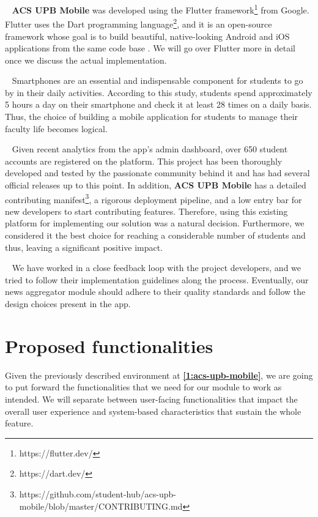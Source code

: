 ~
\textbf{ACS UPB Mobile} was developed using the Flutter framework\footnote{https://flutter.dev/} from Google. Flutter uses the Dart programming language\footnote{https://dart.dev/}, and it is an open-source framework whose goal is to build beautiful, native-looking Android and iOS applications from the same code base \cite{whatisflutter}. We will go over Flutter more in detail once we discuss the actual implementation.

~
Smartphones are an essential and indispensable component for students to go by in their daily activities. According to this study\cite{students_smartphones}, students spend approximately 5 hours a day on their smartphone and check it at least 28 times on a daily basis. Thus, the choice of building a mobile application for students to manage their faculty life becomes logical.

~
Given recent analytics from the app's admin dashboard, over 650 student accounts are registered on the platform. This project has been thoroughly developed and tested by the passionate community behind it and has had several official releases up to this point. In addition, \textbf{ACS UPB Mobile} has a detailed contributing manifest\footnote{https://github.com/student-hub/acs-upb-mobile/blob/master/CONTRIBUTING.md}, a rigorous deployment pipeline, and a low entry bar for new developers to start contributing features. Therefore, using this existing platform for implementing our solution was a natural decision. Furthermore, we considered it the best choice for reaching a considerable number of students and thus, leaving a significant positive impact.

~
We have worked in a close feedback loop with the project developers, and we tried to follow their implementation guidelines along the process. Eventually, our news aggregator module should adhere to their quality standards and follow the design choices present in the app.


\section{Proposed functionalities} \label{1:functionalities}

Given the previously described environment at \textbf{\ref{1:acs-upb-mobile}}, we are going to put forward the functionalities that we need for our module to work as intended. We will separate between user-facing functionalities that impact the overall user experience and system-based characteristics that sustain the whole feature.

